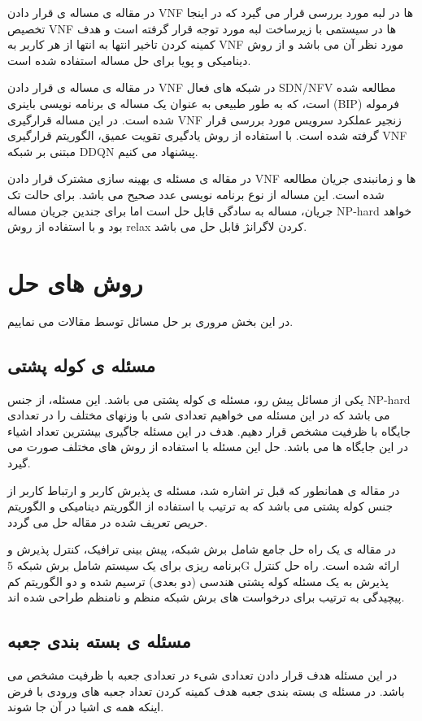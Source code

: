 در مقاله ی
\cite{cziva2018dynamic}
مساله ی قرار دادن VNF ها در لبه مورد بررسی قرار می گیرد که در اینجا تخصیص VNF ها در سیستمی با زیرساخت لبه مورد توجه قرار گرفته است و هدف کمینه کردن تاخیر انتها به انتها از هر کاربر به VNF مورد نظر آن می باشد و از روش دینامیکی و پویا برای حل مساله استفاده شده است. 

در مقاله ی
\cite{pei2019optimal}
مساله ی قرار دادن VNF در شبکه های فعال SDN/NFV مطالعه شده است، که به طور طبیعی به عنوان یک مساله ی برنامه نویسی باینری (BIP) فرموله شده است. 
در این مساله قرارگیری VNF زنجیر عملکرد سرویس مورد بررسی قرار گرفته شده است. 
با استفاده از روش یادگیری تقویت عمیق، الگوریتم قرارگیری VNF مبتنی بر شبکه DDQN  پیشنهاد می کنیم.

در مقاله ی
\cite{ren2020joint}
 مسئله ی بهینه سازی مشترک قرار دادن VNF ها و زمانبندی جریان مطالعه شده است.
 این مساله از نوع برنامه نویسی عدد صحیح می باشد.
 برای حالت تک جریان، مساله به سادگی قابل حل است اما برای جندین جریان مساله
 NP-hard
 خواهد بود و با استفاده از روش relax کردن لاگرانژ
 قابل حل می باشد.
\section{روش های حل}
در این بخش مروری بر حل مسائل توسط مقالات می نماییم.
\subsection{ مسئله ی کوله پشتی }
یکی از مسائل پیش رو، مسئله ی کوله پشتی 
می باشد.
این مسئله، از جنس NP-hard
می باشد که در این مسئله می خواهیم تعدادی شی با وزنهای مختلف را در تعدادی جایگاه با ظرفیت مشخص قرار دهیم.
هدف در این مسئله جاگیری بیشترین تعداد اشیاء در این جایگاه ها می باشد.
حل این مسئله با استفاده از روش های مختلف صورت می گیرد.

در مقاله ی \cite{lee2018dynamic}
همانطور که قبل تر اشاره شد، مسئله ی پذیرش کاربر و ارتباط کاربر از جنس کوله پشتی
 می باشد که به ترتیب با استفاده از الگوریتم دینامیکی و الگوریتم حریص تعریف شده در مقاله
 حل می گردد.

در مقاله ی
\cite{sciancalepore2017mobile}
یک راه حل جامع شامل برش شبکه، پیش بینی ترافیک، کنترل پذیرش و برنامه ریزی برای یک سیستم شامل برش شبکه 5G ارائه شده است.
راه حل کنترل پذیرش به یک مسئله کوله پشتی هندسی (دو بعدی) ترسیم شده و دو الگوریتم کم پیچیدگی به ترتیب برای درخواست های برش شبکه منظم و نامنظم طراحی شده اند.
\subsection{مسئله ی بسته بندی جعبه}
 در این مسئله هدف قرار دادن تعدادی شیء در تعدادی جعبه با ظرفیت مشخص می باشد.
در مسئله ی بسته بندی جعبه 
هدف کمینه کردن تعداد جعبه های ورودی با فرض اینکه همه ی اشیا در آن جا شوند.

